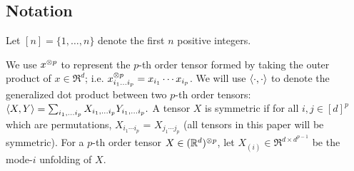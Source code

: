 




\subsection{Notation}


Let $[n] = \{ 1, \dots, n \}$ denote the first $n$ positive integers.

We use $x^{\otimes p}$ to represent the $p$-th order tensor
formed by taking the outer product of $x \in \Re^d$; i.e. $x^{\otimes p}_{i_1 \ldots
i_p} = x_{i_1} \cdots x_{i_p}$. We will use
$\langle \cdot, \cdot \rangle$ to denote the generalized dot product between two $p$-th
order tensors: $\langle X, Y \rangle = \sum_{i_1, \ldots i_p} X_{i_1,
\ldots i_p} Y_{i_1, \ldots i_p}.$
A tensor $X$ is symmetric if for all $i,j \in [d]^p$ which are permutations,
$X_{i_1 \cdots i_p}$ = $X_{j_1 \cdots j_p}$ (all tensors in this paper will be symmetric).
For a $p$-th order tensor $X \in (\mathbb{R}^d)^{\otimes p}$, let $X_{(i)} \in \Re^{d \times d^{p-1}}$
be the mode-$i$ unfolding of $X$.

